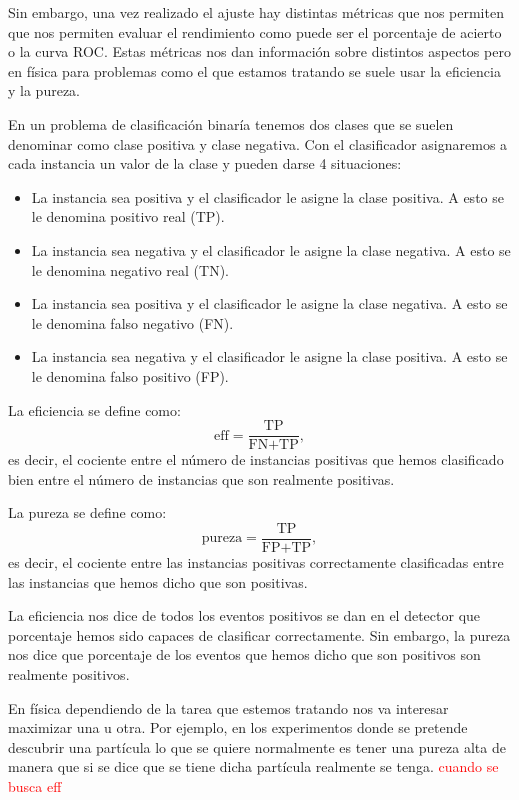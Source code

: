 \documentclass[a4paper,12pt,twoside,titlepage]{article}
\newcommand{\red}[1]{\textcolor{red}{#1}}
\begin{document}
Sin embargo, una vez realizado el ajuste hay distintas métricas que nos permiten que nos permiten evaluar el rendimiento como puede ser el porcentaje de acierto o la curva ROC. Estas métricas nos dan información sobre distintos aspectos pero en física para problemas como el que estamos tratando se suele usar la eficiencia y la pureza.

En un problema de clasificación binaría tenemos dos clases que se suelen denominar como clase positiva y clase negativa. Con el clasificador asignaremos a cada instancia un valor de la clase y pueden darse 4 situaciones:

\begin{itemize}
  \item La instancia sea positiva y el clasificador le asigne la clase positiva. A esto se le denomina positivo real (TP).
  \item La instancia sea negativa y el clasificador le asigne la clase negativa. A esto se le denomina negativo real (TN).
  \item La instancia sea positiva y el clasificador le asigne la clase negativa. A esto se le denomina falso negativo (FN).
  \item La instancia sea negativa y el clasificador le asigne la clase positiva. A esto se le denomina falso positivo (FP).
\end{itemize} 

La eficiencia se define como:
\begin{equation}
  \text{eff} = \frac{\text{TP}}{\text{FN} + \text{TP}},
\end{equation}
es decir, el cociente entre el número de instancias positivas que hemos clasificado bien entre el número de instancias que son realmente positivas.

La pureza se define como:
\begin{equation}
  \text{pureza} = \frac{\text{TP}}{\text{FP} + \text{TP}},
\end{equation}
es decir, el cociente entre las instancias positivas correctamente clasificadas entre las instancias que hemos dicho que son positivas. 

La eficiencia nos dice de todos los eventos positivos se dan en el detector que porcentaje hemos sido capaces de clasificar correctamente. Sin embargo, la pureza nos dice que porcentaje de los eventos que hemos dicho que son positivos son realmente positivos.

En física dependiendo de la tarea que estemos tratando nos va interesar maximizar una u otra. Por ejemplo, en los experimentos donde se pretende descubrir una partícula lo que se quiere normalmente es tener una pureza alta de manera que si se dice que se tiene dicha partícula realmente se tenga. \red{cuando se busca eff} 
\end{document}
